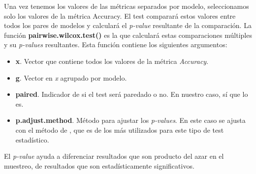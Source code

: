 \documentclass[]{article}
\newenvironment{Shaded}{\begin{snugshade}}{\end{snugshade}}
\newcommand{\DataTypeTok}[1]{\textcolor[rgb]{0.13,0.29,0.53}{#1}}
\newcommand{\KeywordTok}[1]{\textcolor[rgb]{0.13,0.29,0.53}{\textbf{#1}}}
\newcommand{\NormalTok}[1]{#1}
\newcommand{\OperatorTok}[1]{\textcolor[rgb]{0.81,0.36,0.00}{\textbf{#1}}}
\newcommand{\OtherTok}[1]{\textcolor[rgb]{0.56,0.35,0.01}{#1}}
\newcommand{\StringTok}[1]{\textcolor[rgb]{0.31,0.60,0.02}{#1}}
\providecommand{\tightlist}{%
  \setlength{\itemsep}{0pt}\setlength{\parskip}{0pt}}
\begin{document}
Una vez tenemos los valores de las métricas separados por modelo, seleccionamos solo los valores de la métrica Accuracy. El test comparará estos valores entre todos los pares de modelos y calculará el \emph{p-value} resultante de la comparación. La función \textbf{pairwise.wilcox.test()} es la que calculará estas comparaciones múltiples y su \emph{p-values} resultantes. Esta función contiene los siguientes argumentos:

\begin{itemize}
\tightlist
\item
  \textbf{x}. Vector que contiene todos los valores de la métrica \emph{Accuracy}.
\item
  \textbf{g}. Vector en \emph{x} agrupado por modelo.
\item
  \textbf{paired}. Indicador de si el test será paredado o no. En nuestro caso, sí que lo es.
\item
  \textbf{p.adjust.method}. Método para ajustar los \emph{p-values}. En
  este caso se ajusta con el método de
  \href{https://en.wikipedia.org/wiki/Holm\%E2\%80\%93Bonferroni_method}{\color{blue}{Holm's}},
  que es de los más utilizados para este tipo de test estadístico.
\end{itemize}

\vspace{2mm}

\begin{Shaded}
\end{Shaded}

\begin{tcolorbox}
	El \emph{p-value} ayuda a diferenciar resultados que son producto del azar en el muestreo, de resultados que son estadísticamente significativos. 
\end{tcolorbox}
\end{document}
